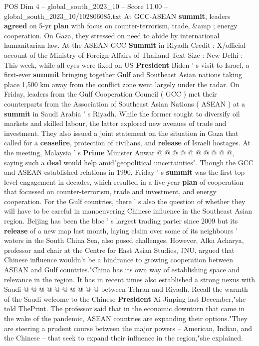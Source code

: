 \begin{textsample}{POS Dim 4 – global\_south\_2023\_10 – Score 11.00 – global\_south\_2023\_10/102806085.txt}  \label{ex:f4_pos_440}
At GCC-ASEAN \textbf{summit}, leaders \textbf{agreed} on 5-yr \textbf{plan} with focus on counter-terrorism, trade, \&amp ; energy cooperation.
On Gaza, they stressed on need to abide by international humanitarian law.
At the ASEAN-GCC \textbf{Summit} in Riyadh Credit : X/official account of the Ministry of Foreign Affairs of Thailand Text Size : New Delhi : This week, while all eyes were fixed on US \textbf{President} Biden ' s visit to Israel, a first-ever \textbf{summit} bringing together Gulf and Southeast Asian nations taking place 1,500 km away from the conflict zone went largely under the radar.
On Friday, leaders from the Gulf Cooperation Council ( GCC ) met their counterparts from the Association of Southeast Asian Nations ( ASEAN ) at a \textbf{summit} in Saudi Arabia ' s Riyadh.
While the former sought to diversify oil markets and skilled labour, the latter explored new avenues of trade and investment.
They also issued a joint statement on the situation in Gaza that called for a \textbf{ceasefire}, protection of civilians, and \textbf{release} of Israeli hostages.
At the meeting, Malaysia ' s \textbf{Prime} Minister Anwar @ @ @ @ @ @ @ @ @ @, saying such a \textbf{deal} would help amid"geopolitical uncertainties".
Though the GCC and ASEAN established relations in 1990, Friday ' s \textbf{summit} was the first top-level engagement in decades, which resulted in a five-year \textbf{plan} of cooperation that focussed on counter-terrorism, trade and investment, and energy cooperation.
For the Gulf countries, there ' s also the question of whether they will have to be careful in manoeuvering Chinese influence in the Southeast Asian region.
Beijing has been the bloc ' s largest trading parter since 2009 but its \textbf{release} of a new map last month, laying claim over some of its neighbours ' waters in the South China Sea, also posed challenges.
However, Alka Acharya, professor and chair at the Centre for East Asian Studies, JNU, argued that Chinese influence wouldn't be a hindrance to growing cooperation between ASEAN and Gulf countries."China has its own way of establishing space and relevance in the region.
It has in recent times also established a strong nexus with Saudi @ @ @ @ @ @ @ @ @ @ between Tehran and Riyadh.
Recall the warmth of the Saudi welcome to the Chinese \textbf{President} Xi Jinping last December,"she told ThePrint.
The professor said that in the economic downturn that came in the wake of the pandemic, ASEAN countries are expanding their options."They are steering a prudent course between the major powers -- American, Indian, and the Chinese -- that seek to expand their influence in the region,"she explained.

\end{textsample}
